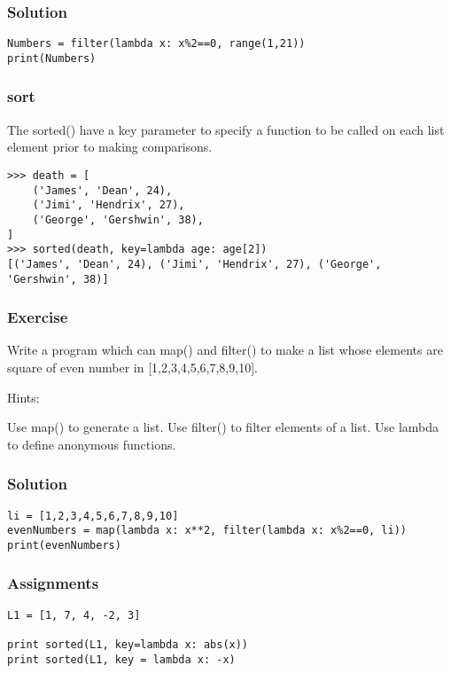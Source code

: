 \begin{frame}[fragile]\frametitle{Solution}
\begin{lstlisting}
Numbers = filter(lambda x: x%2==0, range(1,21))
print(Numbers)
\end{lstlisting}
\end{frame}


\begin{frame}[fragile]\frametitle{sort}
The sorted() have a key parameter to specify a function to be called on each list element prior to making comparisons.
\begin{lstlisting}
>>> death = [
    ('James', 'Dean', 24),
    ('Jimi', 'Hendrix', 27),
    ('George', 'Gershwin', 38),
]
>>> sorted(death, key=lambda age: age[2])
[('James', 'Dean', 24), ('Jimi', 'Hendrix', 27), ('George', 'Gershwin', 38)]
\end{lstlisting}
\end{frame}


\begin{frame}[fragile]\frametitle{Exercise}
Write a program which can map() and filter() to make a list whose elements are square of even number in [1,2,3,4,5,6,7,8,9,10].

Hints:

Use map() to generate a list.
Use filter() to filter elements of a list.
Use lambda to define anonymous functions.

\end{frame}

\begin{frame}[fragile]\frametitle{Solution}
\begin{lstlisting}
li = [1,2,3,4,5,6,7,8,9,10]
evenNumbers = map(lambda x: x**2, filter(lambda x: x%2==0, li))
print(evenNumbers)
\end{lstlisting}
\end{frame}




\begin{frame}[fragile]\frametitle{Assignments}
    	    \begin{lstlisting}
L1 = [1, 7, 4, -2, 3]

print sorted(L1, key=lambda x: abs(x))
print sorted(L1, key = lambda x: -x)
\end{lstlisting}
\end{frame}

